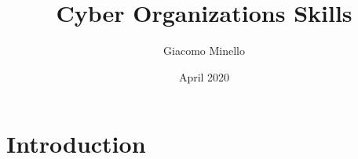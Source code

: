 \documentclass{article}
\title{Cyber Organizations Skills}
\author{Giacomo Minello}
\date{April 2020}
\begin{document}
\maketitle

\section{Introduction}
\end{document}
